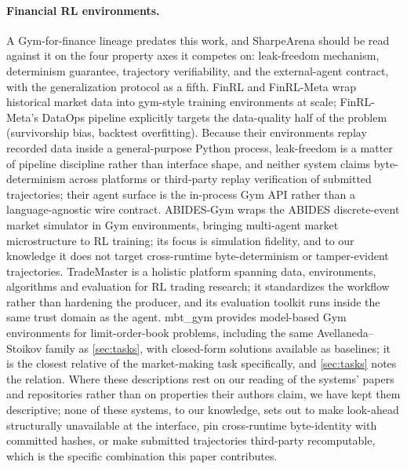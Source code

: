 \paragraph{Financial RL environments.} A Gym-for-finance lineage predates this work, and SharpeArena should be read against it on the four property axes it competes on: leak-freedom mechanism, determinism guarantee, trajectory verifiability, and the external-agent contract, with the generalization protocol as a fifth. FinRL \citep{liu2020finrl} and FinRL-Meta \citep{liu2022finrlmeta} wrap historical market data into gym-style training environments at scale; FinRL-Meta's DataOps pipeline explicitly targets the data-quality half of the problem (survivorship bias, backtest overfitting). Because their environments replay recorded data inside a general-purpose Python process, leak-freedom is a matter of pipeline discipline rather than interface shape, and neither system claims byte-determinism across platforms or third-party replay verification of submitted trajectories; their agent surface is the in-process Gym API rather than a language-agnostic wire contract. ABIDES-Gym \citep{amrouni2021abidesgym} wraps the ABIDES discrete-event market simulator \citep{byrd2020abides} in Gym environments, bringing multi-agent market microstructure to RL training; its focus is simulation fidelity, and to our knowledge it does not target cross-runtime byte-determinism or tamper-evident trajectories. TradeMaster \citep{sun2023trademaster} is a holistic platform spanning data, environments, algorithms and evaluation for RL trading research; it standardizes the workflow rather than hardening the producer, and its evaluation toolkit runs inside the same trust domain as the agent. mbt\_gym \citep{jerome2023mbtgym} provides model-based Gym environments for limit-order-book problems, including the same Avellaneda--Stoikov family as \cref{sec:tasks}, with closed-form solutions available as baselines; it is the closest relative of the market-making task specifically, and \cref{sec:tasks} notes the relation. Where these descriptions rest on our reading of the systems' papers and repositories rather than on properties their authors claim, we have kept them descriptive; none of these systems, to our knowledge, sets out to make look-ahead structurally unavailable at the interface, pin cross-runtime byte-identity with committed hashes, or make submitted trajectories third-party recomputable, which is the specific combination this paper contributes.

